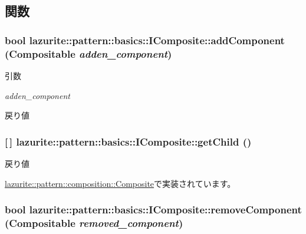 \subsection{関数}
\hypertarget{interfacelazurite_1_1pattern_1_1basics_1_1_i_composite_a1bda2185c1ff53f55c3f37e5be24501c}{
\subsubsection[{addComponent}]{\setlength{\rightskip}{0pt plus 5cm}bool lazurite::pattern::basics::IComposite::addComponent ({\bf Compositable} {\em adden\_\-component})}}
\label{interfacelazurite_1_1pattern_1_1basics_1_1_i_composite_a1bda2185c1ff53f55c3f37e5be24501c}

\begin{DoxyParams}{引数}
\item[{\em adden\_\-component}]\end{DoxyParams}
\begin{DoxyReturn}{戻り値}

\end{DoxyReturn}
\hypertarget{interfacelazurite_1_1pattern_1_1basics_1_1_i_composite_a81b5f73ea025b82e6e86474d8b426a4a}{
\subsubsection[{getChild}]{ \mbox{[}$\,$\mbox{]} lazurite::pattern::basics::IComposite::getChild ()}}
\label{interfacelazurite_1_1pattern_1_1basics_1_1_i_composite_a81b5f73ea025b82e6e86474d8b426a4a}
\begin{DoxyReturn}{戻り値}

\end{DoxyReturn}


\hyperlink{classlazurite_1_1pattern_1_1composition_1_1_composite_a41bcfd17d90cfdae6befc1839657ee73}{lazurite::pattern::composition::Composite}で実装されています。\hypertarget{interfacelazurite_1_1pattern_1_1basics_1_1_i_composite_ad2e4a4dc47b2f42ceec56890b08dbb5e}{
\subsubsection[{removeComponent}]{\setlength{\rightskip}{0pt plus 5cm}bool lazurite::pattern::basics::IComposite::removeComponent ({\bf Compositable} {\em removed\_\-component})}}
\label{interfacelazurite_1_1pattern_1_1basics_1_1_i_composite_ad2e4a4dc47b2f42ceec56890b08dbb5e}

